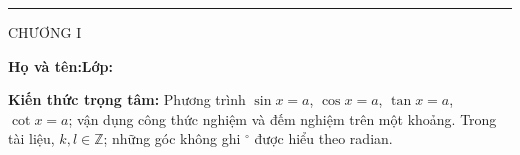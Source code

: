 \documentclass[11pt,a4paper]{article}
\begin{document}
\noindent
\begin{minipage}[t]{.35\linewidth}
 \vspace{2pt}\rule{.73\linewidth}{.4pt}\par\vspace{3pt}
 CHƯƠNG I\par\vspace{3pt}{\itshape TÀI LIỆU HỌC TẬP -- BÀI 04\par}
\end{minipage}\hfill
\begin{minipage}[t]{.62\linewidth}
 \vspace{4pt}{\small\bfseries BÀI 04. PHƯƠNG TRÌNH\par LƯỢNG GIÁC CƠ BẢN\par}
\end{minipage}

\vspace{5mm}
\noindent\textbf{Họ và tên:}\dotfill\hfill\textbf{Lớp:}\enspace\dotfill
\vspace{3mm}
\begin{theorybox}
\textbf{Kiến thức trọng tâm:} Phương trình $\sin x=a$, $\cos x=a$,
$\tan x=a$, $\cot x=a$; vận dụng công thức nghiệm và đếm nghiệm trên một khoảng.
Trong tài liệu, $k,l\in\mathbb Z$; những góc không ghi $^\circ$ được hiểu theo radian.
\end{theorybox}
\end{document}
